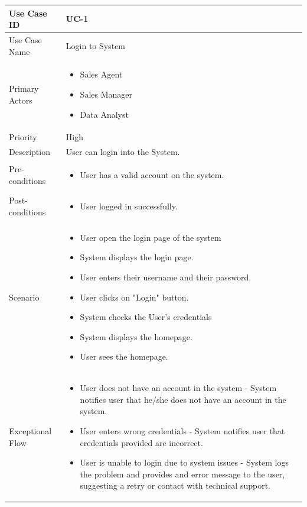 \begin{tabularx}{\textwidth}{|l|X|}
\hline
Use Case ID & UC-1 \\
\hline
Use Case Name & Login to System\\
\hline
Primary Actors & 
\begin{itemize}
    \item Sales Agent
    \item Sales Manager
    \item Data Analyst
\end{itemize} \\
\hline
Priority & High \\
\hline
Description & User can login into the System. \\
\hline
Pre-conditions & 
\begin{itemize}
    \item User has a valid account on the system.
\end{itemize} \\
\hline
Post-conditions & 
\begin{itemize}
    \item User logged in successfully.
\end{itemize} \\
\hline
Scenario & 
\begin{itemize}
    \item User open the login page of the system 
    \item System displays the login page. 
    \item User enters their username and their password. 
    \item User clicks on "Login" button. 
    \item System checks the User’s credentials 	
    \item System displays the homepage.	
    \item User sees the homepage.
\end{itemize}\\
\hline
Exceptional Flow & 
\begin{itemize}
    \item User does not have an account in the system - System notifies user that he/she does not have an account in the system. 
    \item User enters wrong credentials - System notifies user that credentials provided are incorrect.
    \item User is unable to login due to system issues - System logs the problem and provides and error message to the user, suggesting a retry or contact with technical support.
\end{itemize}\\
\hline
\end{tabularx}

